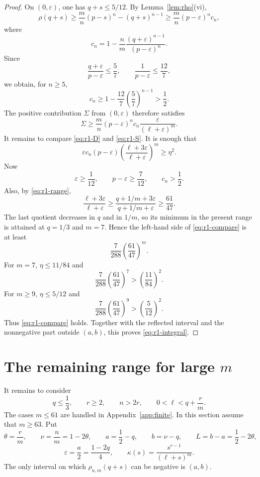 \documentclass[11pt]{article}
\numberwithin{equation}{section}
\newcommand{\eps}{\varepsilon}
\begin{document}
\begin{proof}
On $(0,\eps)$, one has $q+s\le5/12$. By Lemma~\ref{lem:rho}(vi),
\[
 \rho(q+s)
 \ge\frac mn(p-s)^n-(q+s)^{n-1}
 \ge\frac mn(p-\eps)^n c_n,
\]
where
\[
 c_n=1-\frac nm\frac{(q+\eps)^{n-1}}{(p-\eps)^n}.
\]
Since
\[
        \frac{q+\eps}{p-\eps}\le\frac57,
        \qquad
        \frac1{p-\eps}\le\frac{12}{7},
\]
we obtain, for $n\ge5$,
\[
        c_n\ge1-\frac{12}{7}\left(\frac57\right)^{n-1}>\frac12.
\]
The positive contribution $\Sigma$ from $(0,\eps)$ therefore satisfies
\begin{equation}\label{eq:r1-S}
        \Sigma\ge\frac mn(p-\eps)^n c_n
        \frac{\eps}{(\ell+\eps)^m}.
\end{equation}
It remains to compare \eqref{eq:r1-D} and \eqref{eq:r1-S}. It is enough that
\begin{equation}\label{eq:r1-compare}
 \eps c_n(p-\eps)
 \left(\frac{\ell+3\eps}{\ell+\eps}\right)^m
 \ge\eta^2.
\end{equation}
Now
\[
        \eps\ge\frac1{12},
        \qquad p-\eps\ge\frac7{12},
        \qquad c_n>\frac12.
\]
Also, by \eqref{eq:r1-range},
\[
 \frac{\ell+3\eps}{\ell+\eps}
 \ge\frac{q+1/m+3\eps}{q+1/m+\eps}
 \ge\frac{61}{47}.
\]
The last quotient decreases in $q$ and in $1/m$, so its minimum in the present range is attained at $q=1/3$ and $m=7$. Hence the left-hand side of \eqref{eq:r1-compare} is at least
\[
        \frac7{288}\left(\frac{61}{47}\right)^m.
\]
For $m=7$, $\eta\le11/84$ and
\[
        \frac7{288}\left(\frac{61}{47}\right)^7
        >\left(\frac{11}{84}\right)^2.
\]
For $m\ge9$, $\eta\le5/12$ and
\[
        \frac7{288}\left(\frac{61}{47}\right)^9
        >\left(\frac5{12}\right)^2.
\]
Thus \eqref{eq:r1-compare} holds. Together with the reflected interval and the nonnegative part outside $(a,b)$, this proves \eqref{eq:r1-integral}.
\end{proof}

\section{The remaining range for large \texorpdfstring{$m$}{m}}

It remains to consider
\begin{equation}\label{eq:remaining-range}
 q\le\frac13,
 \qquad r\ge2,
 \qquad n>2r,
 \qquad 0<\ell<q+\frac rm.
\end{equation}
The cases $m\le61$ are handled in Appendix~\ref{app:finite}. In this section assume that $m\ge63$. Put
\begin{equation}\label{eq:tail-notation}
 \theta=\frac rm,
 \qquad \nu=\frac nm=1-2\theta,
 \qquad a=\frac12-q,
 \qquad b=\nu-q,
 \qquad L=b-a=\frac12-2\theta,
\end{equation}
\[
        \eps=\frac{a}{2}=\frac{1-2q}{4},
        \qquad
        \kappa(s)=\frac{s^{r-1}}{(\ell+s)^m}.
\]
The only interval on which $\rho_{n,m}(q+s)$ can be negative is $(a,b)$.
\end{document}
